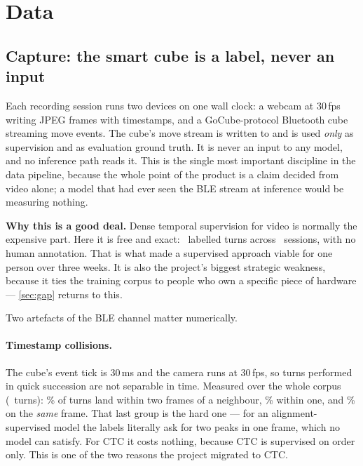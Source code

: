 \section{Data}
\label{sec:data}

\subsection{Capture: the smart cube is a label, never an input}
\label{sec:capture}

Each recording session runs two devices on one wall clock: a webcam at
30\,fps writing JPEG frames with timestamps, and a GoCube-protocol Bluetooth
cube streaming move events. The cube's move stream is written to
 and is used \emph{only} as supervision and as evaluation
ground truth. It is never an input to any model, and no inference path reads
it. This is the single most important discipline in the data pipeline,
because the whole point of the product is a claim decided from video alone;
a model that had ever seen the BLE stream at inference would be measuring
nothing.

\begin{keybox}
\textbf{Why this is a good deal.} Dense temporal supervision for video is
normally the expensive part. Here it is free and exact: \NMovesTotal\
labelled turns across \NSessionsFrames\ sessions, with no human annotation. That is what made a
supervised approach viable for one person over three weeks. It is also the
project's biggest strategic weakness, because it ties the training corpus to
people who own a specific piece of hardware --- \cref{sec:gap} returns to
this.
\end{keybox}

Two artefacts of the BLE channel matter numerically.

\paragraph{Timestamp collisions.} The cube's event tick is 30\,ms and the
camera runs at 30\,fps, so turns performed in quick succession are not
separable in time. Measured over the whole corpus (\CorpusOnsets\ turns):
\CorpusCrowdedTwo\% of turns land within two frames of a neighbour,
\CorpusCrowdedOne\% within one, and \CorpusSameFrame\% on the
\emph{same} frame. That last group is the hard one --- for an
alignment-supervised model the labels literally ask for two peaks in one
frame, which no model can satisfy. For CTC it costs nothing, because CTC is
supervised on order only. This is one of the two reasons the project
migrated to CTC.

